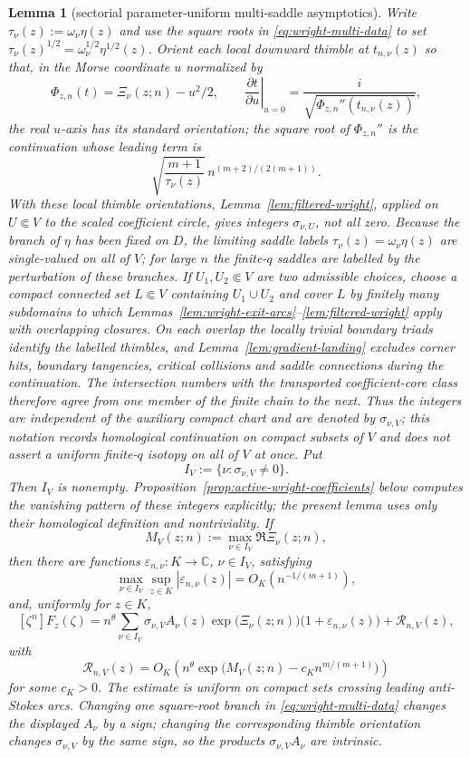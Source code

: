 \documentclass[reqno]{article}
\newtheorem{lem}[theorem]{Lemma}
\theoremstyle{definition}
\theoremstyle{remark}
\theoremstyle{plain}
\newcommand{\C}{\mathbb C}
\begin{document}
\begin{lem}[sectorial parameter-uniform multi-saddle asymptotics]
Write $\tau_\nu(z):=\omega_\nu\eta(z)$ and use the square roots in \eqref{eq:wright-multi-data} to set $\tau_\nu(z)^{1/2}=\omega_\nu^{1/2}\eta^{1/2}(z)$. Orient each local downward thimble at $t_{n,\nu}(z)$ so that, in the Morse coordinate $u$ normalized by
$$\Phi_{z,n}(t)=\Xi_\nu(z;n)-u^2/2,
\qquad
\left.\frac{\partial t}{\partial u}\right|_{u=0}=\frac{i}{\sqrt{\Phi_{z,n}''(t_{n,\nu}(z))}},$$
the real $u$-axis has its standard orientation; the square root of $\Phi_{z,n}''$ is the continuation whose leading term is
$$\sqrt{\frac{m+1}{\tau_\nu(z)}}\,n^{(m+2)/(2(m+1))}.$$
With these local thimble orientations, Lemma~\ref{lem:filtered-wright}, applied on $U\Subset V$ to the scaled coefficient circle, gives integers $\sigma_{\nu,U}$, not all zero. Because the branch of $\eta$ has been fixed on $D$, the limiting saddle labels $\tau_\nu(z)=\omega_\nu\eta(z)$ are single-valued on all of $V$; for large $n$ the finite-$q$ saddles are labelled by the perturbation of these branches. If $U_1,U_2\Subset V$ are two admissible choices, choose a compact connected set $L\Subset V$ containing $U_1\cup U_2$ and cover $L$ by finitely many subdomains to which Lemmas~\ref{lem:wright-exit-arcs}--\ref{lem:filtered-wright} apply with overlapping closures. On each overlap the locally trivial boundary triads identify the labelled thimbles, and Lemma~\ref{lem:gradient-landing} excludes corner hits, boundary tangencies, critical collisions and saddle connections during the continuation. The intersection numbers with the transported coefficient-core class therefore agree from one member of the finite chain to the next. Thus the integers are independent of the auxiliary compact chart and are denoted by $\sigma_{\nu,V}$; this notation records homological continuation on compact subsets of $V$ and does not assert a uniform finite-$q$ isotopy on all of $V$ at once. Put
$$I_V:=\{\nu:\sigma_{\nu,V}\ne0\}.$$
Then $I_V$ is nonempty. Proposition~\ref{prop:active-wright-coefficients} below computes the vanishing pattern of these integers explicitly; the present lemma uses only their homological definition and nontriviality. If
$$M_V(z;n):=\max_{\nu\in I_V}\Re\Xi_\nu(z;n),$$
then there are functions $\varepsilon_{n,\nu}:K\to\C$, $\nu\in I_V$, satisfying
$$\max_{\nu\in I_V}\sup_{z\in K}|\varepsilon_{n,\nu}(z)|=O_K\!\left(n^{-1/(m+1)}\right),$$
and, uniformly for $z\in K$,
\begin{equation}\label{eq:wright-multi}
[\zeta^n]F_z(\zeta)
=
n^\theta\sum_{\nu\in I_V}\sigma_{\nu,V}A_\nu(z)\exp\!\bigl(\Xi_\nu(z;n)\bigr)\bigl(1+\varepsilon_{n,\nu}(z)\bigr)
+\mathcal R_{n,V}(z),
\end{equation}
with
\begin{equation}\label{eq:wright-multi-rem}
\mathcal R_{n,V}(z)=
O_K\!\left(
n^\theta
\exp\!\bigl(M_V(z;n)-c_K n^{m/(m+1)}\bigr)
\right)
\end{equation}
for some $c_K>0$. The estimate is uniform on compact sets crossing leading anti-Stokes arcs. Changing one square-root branch in \eqref{eq:wright-multi-data} changes the displayed $A_\nu$ by a sign; changing the corresponding thimble orientation changes $\sigma_{\nu,V}$ by the same sign, so the products $\sigma_{\nu,V}A_\nu$ are intrinsic.
\end{lem}
\end{document}
